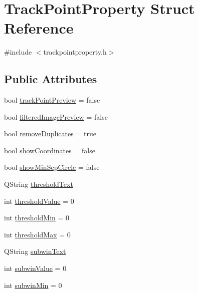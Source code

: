 \hypertarget{struct_track_point_property}{}\section{Track\+Point\+Property Struct Reference}
\label{struct_track_point_property}


{\ttfamily \#include $<$trackpointproperty.\+h$>$}

\subsection*{Public Attributes}
\begin{DoxyCompactItemize}
\item 
bool \mbox{\hyperlink{struct_track_point_property_a8153a5db4ba1ffc4aafa27507763cfde}{track\+Point\+Preview}} = false
\item 
bool \mbox{\hyperlink{struct_track_point_property_a2054356ddad1cdc0fed5b0954bea0fec}{filtered\+Image\+Preview}} = false
\item 
bool \mbox{\hyperlink{struct_track_point_property_aef92f751bf1038c2e4010c722b283233}{remove\+Duplicates}} = true
\item 
bool \mbox{\hyperlink{struct_track_point_property_afe21ce4b421e60138f35968d0ea5cf42}{show\+Coordinates}} = false
\item 
bool \mbox{\hyperlink{struct_track_point_property_a57ec7d62e1d69c0f8daeb0ca34b1a8b6}{show\+Min\+Sep\+Circle}} = false
\item 
Q\+String \mbox{\hyperlink{struct_track_point_property_a3e42b8fec411dd418b4174b76eafeecb}{threshold\+Text}}
\item 
int \mbox{\hyperlink{struct_track_point_property_a85ba7ffd95773f8fa6bc557b6c08d40c}{threshold\+Value}} = 0
\item 
int \mbox{\hyperlink{struct_track_point_property_a2f9e72da74fa98e7cc3bf31604744c2c}{threshold\+Min}} = 0
\item 
int \mbox{\hyperlink{struct_track_point_property_a9f9d52d93a6eec0f1e2749c7198c91c3}{threshold\+Max}} = 0
\item 
Q\+String \mbox{\hyperlink{struct_track_point_property_a45d99933d2afc6228f3150bfb2b95373}{subwin\+Text}}
\item 
int \mbox{\hyperlink{struct_track_point_property_a9a9f1ac1d2fca28ad5043d9aa37fe38e}{subwin\+Value}} = 0
\item 
int \mbox{\hyperlink{struct_track_point_property_af508bb3787b679fe1c63553d91fea927}{subwin\+Min}} = 0

\end{DoxyCompactItemize}
